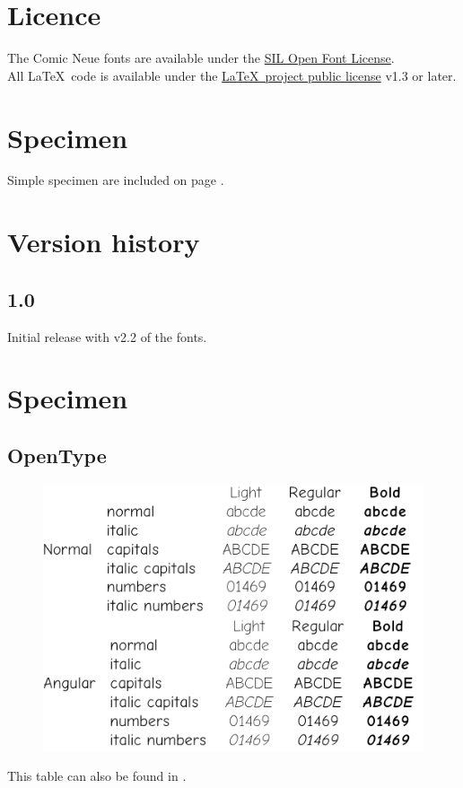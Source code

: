 \documentclass[10pt,a4paper,english]{article}
\begin{document}
\begin{multicols}{2}
\section{Licence}
The Comic Neue fonts are available under the \href{http://scripts.sil.org/OFL}{SIL Open Font License}.\\
All \LaTeX\ code is available under the \href{http://www.latex-project.org/lppl/}{\LaTeX\ project public license} v1.3 or later.

\section{Specimen}
Simple specimen are included on page \pageref{sec:specimen}.

\section{Version history}

\subsection*{1.0}
\begin{itemize*}
	\item Initial release with v2.2 of the fonts.
\end{itemize*}

\end{multicols}

\clearpage

\section{Specimen}
\label{sec:specimen}
\subsection{OpenType}
\begin{figure}[ht]
	\centering
	\includegraphics[width=.7\textwidth]{comicneue-otf-specimen}
\end{figure}
This table can also be found in .
\end{document}
